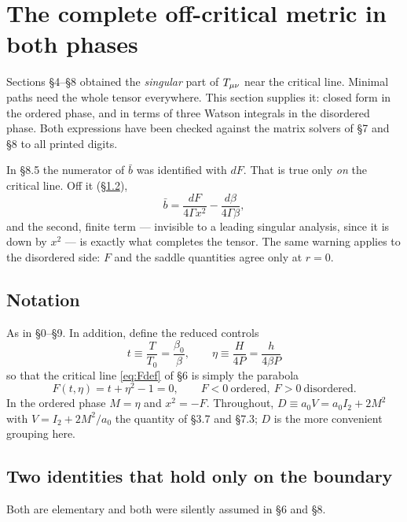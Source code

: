 \section{The complete off-critical metric in both phases}
\noindent
Sections \S4--\S8 obtained the \emph{singular} part of $T_{\mu\nu}$ near the critical line.
Minimal paths need the whole tensor everywhere. This section supplies it: closed form in the
ordered phase, and in terms of three Watson integrals in the disordered phase. Both
expressions have been checked against the matrix solvers of \S7 and \S8 to all printed
digits.

\medskip
\noindent
{} In \S8.5 the numerator of $\bar b$ was identified with
	$dF$. That is true only \emph{on} the critical line. Off it (\S\ref{sec:offbdy}),
	\begin{equation}
		\bar b=\frac{dF}{4\Gamma x^{2}}-\frac{d\beta}{4\Gamma\beta} ,
	\end{equation}
	and the second, finite term --- invisible to a leading singular analysis, since it is down by
	$x^{2}$ --- is exactly what completes the tensor. The same warning applies to the disordered
	side: $F$ and the saddle quantities agree only at $r=0$.
	
\subsection{Notation}
As in \S0--\S9. In addition, define the reduced controls
\begin{equation}
  \boxed{\ t\equiv\frac{T}{T_0}=\frac{\beta_0}{\beta},\qquad
   \eta\equiv\frac{H}{4P}=\frac{h}{4\beta P}\ }
  \label{eq:reduced}
\end{equation}
so that the critical line \eqref{eq:Fdef} of \S6 is simply the parabola
\begin{equation}
  F(t,\eta)=t+\eta^{2}-1=0 ,\qquad F<0\ \text{ordered},\ F>0\ \text{disordered}.
\end{equation}
In the ordered phase $M=\eta$ and $x^{2}=-F$. Throughout, $D\equiv a_0V=a_0I_2+2M^{2}$ with
$V=I_2+2M^{2}/a_0$ the quantity of \S3.7 and \S7.3; $D$ is the more convenient grouping here.

\subsection{Two identities that hold only on the boundary}
\label{sec:offbdy}
Both are elementary and both were silently assumed in \S6 and \S8.

